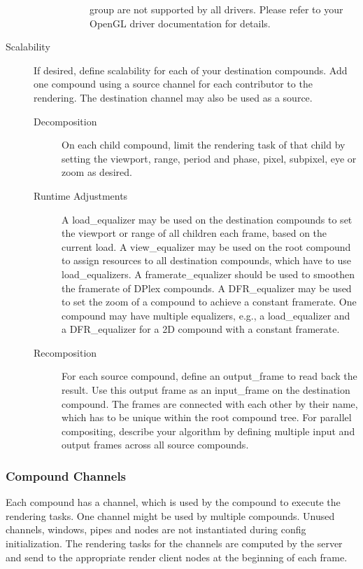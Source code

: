 \documentclass[10pt,a4]{scrartcl}
\begin{document}
\begin{description}
\begin{description}
\begin{description}
      group are not supported by all drivers. Please refer to your
      OpenGL driver documentation for details.
    \end{description}
  \end{description}
\item[Scalability] If desired, define scalability for each of your
  destination compounds. Add one compound using a source channel for
  each contributor to the rendering. The destination channel may also be
  used as a source. 
  \begin{description}
  \item[Decomposition] On each child compound, limit the rendering task of that
    child by setting the \textsf{viewport}, \textsf{range}, \textsf{period} and
    \textsf{phase}, \textsf{pixel}, \textsf{subpixel}, \textsf{eye} or
    \textsf{zoom} as desired.
  \item[Runtime Adjustments] A \textsf{load\_equalizer} may be used on
    the destination compounds to set the \textsf{viewport} or
    \textsf{range} of all children each frame, based on the current
    load. A \textsf{view\_equalizer} may be used on the root compound to
    assign resources to all destination compounds, which have to use
    \textsf{load\_equalizer}s. A \textsf{framerate\_equalizer} should be
    used to smoothen the framerate of DPlex compounds. A
    \textsf{DFR\_equalizer} may be used to set the zoom of a compound to
    achieve a constant framerate. One compound may have multiple
    equalizers, e.g., a \textsf{load\_equalizer} and a
    \textsf{DFR\_equalizer} for a 2D compound with a constant framerate.
  \item[Recomposition] For each source compound, define an
    \textsf{output\_frame} to read back the result. Use this output frame
    as an \textsf{input\_frame} on the destination compound. The frames
    are connected with each other by their name, which has to be unique
    within the root compound tree. For parallel compositing, describe
    your algorithm by defining multiple input and output frames across
    all source compounds.
  \end{description}
\end{description}

\subsubsection{Compound Channels}
Each compound has a channel, which is used by the compound to execute
the rendering tasks. One channel might be used by multiple
compounds. Unused channels, windows, pipes and nodes are not
instantiated during config initialization. The rendering tasks for the
channels are computed by the server and send to the appropriate render
client nodes at the beginning of each frame.
\end{document}
